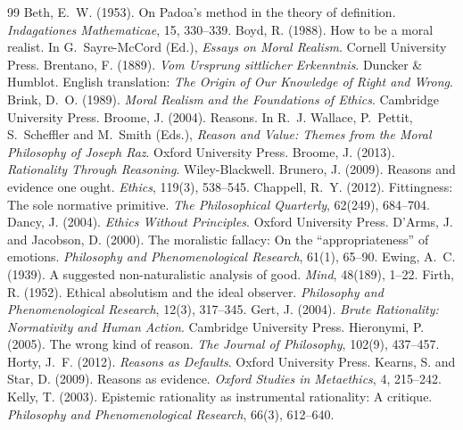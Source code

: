 \documentclass{situationist-preprint}
\begin{document}
\begin{thebibliography}{99}\small
{} Beth, E.~W. (1953). On Padoa's method in the theory of definition. \emph{Indagationes Mathematicae}, 15, 330--339.
 Boyd, R. (1988). How to be a moral realist. In G.~Sayre-McCord (Ed.), \emph{Essays on Moral Realism}. Cornell University Press.
 Brentano, F. (1889). \emph{Vom Ursprung sittlicher Erkenntnis}. Duncker \& Humblot. English translation: \emph{The Origin of Our Knowledge of Right and Wrong}.
 Brink, D.~O. (1989). \emph{Moral Realism and the Foundations of Ethics}. Cambridge University Press.
 Broome, J. (2004). Reasons. In R.~J. Wallace, P.~Pettit, S.~Scheffler and M.~Smith (Eds.), \emph{Reason and Value: Themes from the Moral Philosophy of Joseph Raz}. Oxford University Press.
 Broome, J. (2013). \emph{Rationality Through Reasoning}. Wiley-Blackwell.
 Brunero, J. (2009). Reasons and evidence one ought. \emph{Ethics}, 119(3), 538--545.
 Chappell, R.~Y. (2012). Fittingness: The sole normative primitive. \emph{The Philosophical Quarterly}, 62(249), 684--704.
 Dancy, J. (2004). \emph{Ethics Without Principles}. Oxford University Press.
 D'Arms, J. and Jacobson, D. (2000). The moralistic fallacy: On the \enquote{appropriateness} of emotions. \emph{Philosophy and Phenomenological Research}, 61(1), 65--90.
 Ewing, A.~C. (1939). A suggested non-naturalistic analysis of good. \emph{Mind}, 48(189), 1--22.
 Firth, R. (1952). Ethical absolutism and the ideal observer. \emph{Philosophy and Phenomenological Research}, 12(3), 317--345.
 Gert, J. (2004). \emph{Brute Rationality: Normativity and Human Action}. Cambridge University Press.
 Hieronymi, P. (2005). The wrong kind of reason. \emph{The Journal of Philosophy}, 102(9), 437--457.
 Horty, J.~F. (2012). \emph{Reasons as Defaults}. Oxford University Press.
 Kearns, S. and Star, D. (2009). Reasons as evidence. \emph{Oxford Studies in Metaethics}, 4, 215--242.
 Kelly, T. (2003). Epistemic rationality as instrumental rationality: A critique. \emph{Philosophy and Phenomenological Research}, 66(3), 612--640.

\end{thebibliography}
\end{document}
